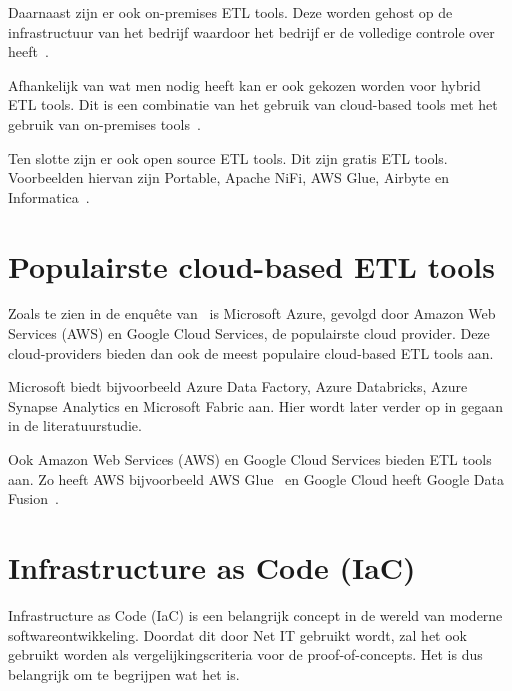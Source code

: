 Daarnaast zijn er ook on-premises ETL tools. Deze worden gehost op de infrastructuur van het bedrijf waardoor het bedrijf er de volledige controle over heeft~\autocite{Ethan2024}.

Afhankelijk van wat men nodig heeft kan er ook gekozen worden voor hybrid ETL tools. Dit is een combinatie van het gebruik van cloud-based tools met het gebruik van on-premises tools~\autocite{Ethan2024}.

Ten slotte zijn er ook open source ETL tools. Dit zijn gratis ETL tools. Voorbeelden hiervan zijn Portable, Apache NiFi, AWS Glue, Airbyte en Informatica~\autocite{Ethan2024}.

\section{Populairste cloud-based ETL tools}

Zoals te zien in de enquête van~\textcite{vines2023overview} is Microsoft Azure, gevolgd door Amazon Web Services (AWS) en Google Cloud Services, de populairste cloud provider. Deze cloud-providers bieden dan ook de meest populaire cloud-based ETL tools aan. 

Microsoft biedt bijvoorbeeld Azure Data Factory, Azure Databricks, Azure Synapse Analytics en Microsoft Fabric aan. Hier wordt later verder op in gegaan in de literatuurstudie.


Ook Amazon Web Services (AWS) en Google Cloud Services bieden ETL tools aan. Zo heeft AWS bijvoorbeeld AWS Glue~\autocite{Khan2024} en Google Cloud heeft Google Data Fusion~\autocite{Jaiswal2022}.

\section{Infrastructure as Code (IaC)}

Infrastructure as Code (IaC) is een belangrijk concept in de wereld van moderne softwareontwikkeling. Doordat dit door Net IT gebruikt wordt, zal het ook gebruikt worden als vergelijkingscriteria voor de proof-of-concepts. Het is dus belangrijk om te begrijpen wat het is.\\ 

